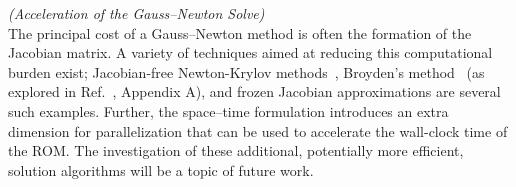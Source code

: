 \begin{remark}\label{remark:gaussnewton}\textit{(Acceleration of the Gauss--Newton Solve)}\\
	The principal cost of a Gauss--Newton method is often the formation of the Jacobian matrix. A variety of techniques aimed at 
reducing this computational burden exist; Jacobian-free Newton-Krylov
	methods~\cite{jfnk}, Broyden's method~\cite{broyden} (as explored in
	Ref.~\cite{carlberg_thesis}, Appendix A), and frozen Jacobian approximations
	are several such examples. Further, the space--time formulation introduces an extra dimension for parallelization that can be used to accelerate the wall-clock time of the ROM. The investigation of these additional, potentially more efficient, solution algorithms will be a topic of future work. 
\end{remark}
